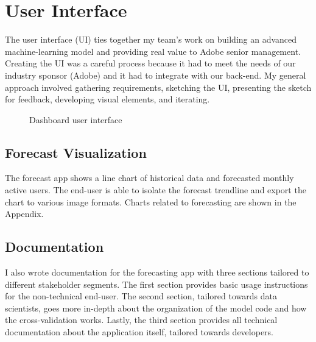 \documentclass[11pt, oneside]{report}
\begin{document}
\section{User Interface}
\label{user_interface}
The user interface (UI) ties together my team's work on building an advanced machine-learning model and providing real value to Adobe senior management. Creating the UI was a careful process because it had to meet the needs of our industry sponsor (Adobe) and it had to integrate with our back-end. My general approach involved gathering requirements, sketching the UI, presenting the sketch for feedback, developing visual elements, and iterating.

\begin{figure}[h]
  \caption{Dashboard user interface}
  \centering
  \label{fig:Dashboard}
\end{figure}

\subsection{Forecast Visualization}
The forecast app shows a line chart of historical data and forecasted monthly active users. The end-user is able to isolate the forecast trendline and export the chart to various image formats. Charts related to forecasting are shown in the Appendix.

\subsection{Documentation}
I also wrote documentation for the forecasting app with three sections tailored to different stakeholder segments. The first section provides basic usage instructions for the non-technical end-user. The second section, tailored towards data scientists, goes more in-depth about the organization of the model code and how the cross-validation works. Lastly, the third section provides all technical documentation about the application itself, tailored towards developers.
\end{document}
